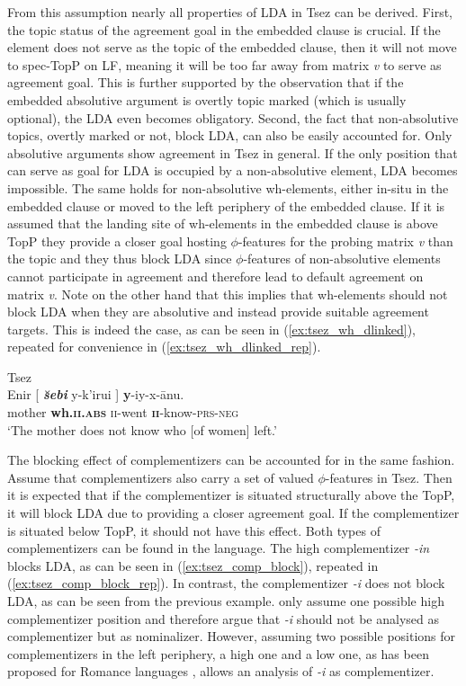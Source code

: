 \documentclass[output=paper
,modfonts
,nonflat]{langsci/langscibook}
\begin{document}
From this assumption nearly all properties of LDA in Tsez can be derived. First, the topic status of the agreement goal in the embedded clause is crucial. If the element does not serve as the topic of the embedded clause, then it will not move to spec-TopP on LF, meaning it will be too far away from matrix \textit{v} to serve as agreement goal. This is further supported by the observation that if the embedded absolutive argument is overtly topic marked (which is usually optional), the LDA even becomes obligatory. Second, the fact that non-absolutive topics, overtly marked or not, block LDA, can also be easily accounted for. Only absolutive arguments show agreement in Tsez in general. If the only position that can serve as goal for LDA is occupied by a non-absolutive element, LDA becomes impossible. The same holds for non-absolutive wh-elements, either in-situ in the embedded clause or moved to the left periphery of the embedded clause. If it is assumed that the landing site of wh-elements in the embedded clause is above TopP they provide a closer goal hosting $ \phi $-features for the probing matrix \textit{v} than the topic and they thus block LDA since $ \phi $-features of non-absolutive elements cannot participate in agreement and therefore lead to default agreement on matrix \textit{v}. Note on the other hand that this implies that wh-elements should not block LDA when they are absolutive and instead provide suitable agreement targets. This is indeed the case, as can be seen in (\ref{ex:tsez_wh_dlinked}), repeated for convenience in (\ref{ex:tsez_wh_dlinked_rep}).
\begin{exe}
\ex Tsez \citep[][fn. 20]{Polinsky_Potsdam2001}\label{ex:tsez_wh_dlinked_rep}\\
	\gll Enir [ \textbf{\textit{\u{s}ebi}} y-k'iru\textipa{\textbeltl}i ] \textbf{y}-iy-x-\={a}nu.\\
		 mother {} \textbf{wh.\textsc{ii.abs}} \textsc{ii}-went {} \textbf{\textsc{ii}}-know-\textsc{prs-neg}\\
	\glt `The mother does not know who [of women] left.'
\end{exe}
The blocking effect of complementizers can be accounted for in the same fashion. Assume that complementizers also carry a set of valued $ \phi $-features in Tsez. Then it is expected that if the complementizer is situated structurally above the TopP, it will block LDA due to providing a closer agreement goal. If the complementizer is situated below TopP, it should not have this effect. Both types of complementizers can be found in the language. The high complementizer \textit{-\textipa{\textcrlambda}in} blocks LDA, as can be seen in (\ref{ex:tsez_comp_block}), repeated in (\ref{ex:tsez_comp_block_rep}). In contrast, the complementizer \textit{-\textipa{\textbeltl}i} does not block LDA, as can be seen from the previous example. \citet{Polinsky_Potsdam2001} only assume one possible high complementizer position and therefore argue that \textit{-\textipa{\textbeltl}i} should not be analysed as complementizer but as nominalizer. However, assuming two possible positions for complementizers in the left periphery, a high one and a low one, as has been proposed for Romance languages \citep{Ledgeway2005}, allows an analysis of \textit{-\textipa{\textbeltl}i} as complementizer.
\end{document}
